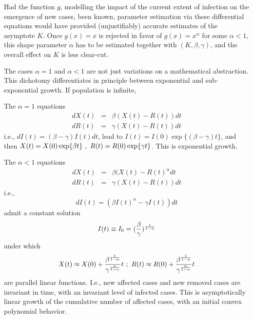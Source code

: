 \documentclass{article}
\begin{document}
Had the function $g$, modelling the impact of the current extent of infection on the emergence of new cases, been known, parameter estimation via these differential equations would have provided (unjustifiably) accurate estimates of the asymptote $K$. Once $g(x)=x$ is rejected in favor of \linebreak $g(x)=x^\alpha$ for some $\alpha<1$, this shape parameter $\alpha$ has to be estimated together with $(K , \beta, \gamma)$, and the overall effect on $K$ is less clear-cut.

\bigskip

 The cases $\alpha=1$ and $\alpha<1$ are not just variations on a mathematical abstraction. This dichotomy differentiates in principle between exponential and sub-exponential growth. If population is infinite,

The $\alpha=1$ equations
\begin{eqnarray}
d X(t) & = & \beta (X(t)-R(t)) dt \label{DEforX1} \\
d R(t) & = & \gamma (X(t)-R(t)) dt \label{DEforR1}
\end{eqnarray}
i.e., $d I(t) = (\beta-\gamma) I(t) dt$, lead to $I(t)=I(0)\exp\{(\beta-\gamma)t\}$, and then $X(t)=X(0)\exp\{\beta t\} \ , \ \linebreak R(t)=R(0)\exp\{\gamma t\}$. This is exponential growth.

The $\alpha<1$ equations
\begin{eqnarray}
dX(t) & = & \beta (X(t)-R(t)^\alpha dt \label{DEforX2} \\
dR(t) & = & \gamma (X(t)-R(t)) dt \label{DEforR2}
\end{eqnarray}
i.e.,
\begin{equation}
\label{DEforI}
d I(t) = (\beta I(t)^\alpha - \gamma I(t))dt
\end{equation}
admit a constant solution
\begin{equation}
\label{Isub0}
I(t) \equiv I_0 = ({\beta \over \gamma})^{1 \over {1-\alpha}}
\end{equation}
under which
\begin{equation}
\label{slopes}
X(t) \approx X(0)+{{\beta^{1 \over {1-\alpha}}} \over {\gamma^{\alpha \over {1-\alpha}}}} t  \ ; \ R(t) \approx R(0)+{{\beta^{1 \over {1-\alpha}}} \over {\gamma^{\alpha \over {1-\alpha}}}} t
\end{equation}
are parallel linear functions. I.e., new affected cases and new removed cases are invariant in time, with an invariant level of infected cases.
This is asymptotically linear growth of the cumulative number of affected cases, with an initial convex polynomial behavior.
\end{document}
